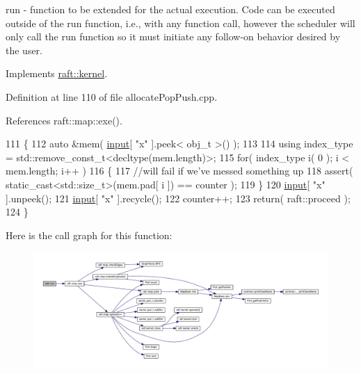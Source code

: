 run -\/ function to be extended for the actual execution. Code can be executed outside of the run function, i.\+e., with any function call, however the scheduler will only call the run function so it must initiate any follow-\/on behavior desired by the user. 

Implements \hyperlink{classraft_1_1kernel_a05094286d7577360fb1b91c91fc05901}{raft\+::kernel}.



Definition at line 110 of file allocate\+Pop\+Push.\+cpp.



References raft\+::map\+::exe().


\begin{DoxyCode}
111     \{
112         \textcolor{keyword}{auto} &mem( \hyperlink{classraft_1_1kernel_a6edbe35a56409d402e719b3ac36d6554}{input}[ \textcolor{stringliteral}{"x"} ].peek< obj\_t >() );
113 
114         \textcolor{keyword}{using} index\_type = std::remove\_const\_t<decltype(mem.length)>;
115         \textcolor{keywordflow}{for}( index\_type i( 0 ); i < mem.length; i++ )
116         \{
117             \textcolor{comment}{//will fail if we've messed something up}
118             assert( static\_cast<std::size\_t>(mem.pad[ i ]) == counter );
119         \}
120         \hyperlink{classraft_1_1kernel_a6edbe35a56409d402e719b3ac36d6554}{input}[ \textcolor{stringliteral}{"x"} ].unpeek();
121         \hyperlink{classraft_1_1kernel_a6edbe35a56409d402e719b3ac36d6554}{input}[ \textcolor{stringliteral}{"x"} ].recycle();
122         counter++;
123         \textcolor{keywordflow}{return}( raft::proceed );
124     \}
\end{DoxyCode}
Here is the call graph for this function\+:
\nopagebreak
\begin{figure}[H]
\begin{center}
\leavevmode
\includegraphics[width=350pt]{classlast_a7a1da1c30f571a8e8ccb515ca2cb2f02_cgraph}
\end{center}
\end{figure}
\hypertarget{classlast_a7a1da1c30f571a8e8ccb515ca2cb2f02}{}\label{classlast_a7a1da1c30f571a8e8ccb515ca2cb2f02} 
